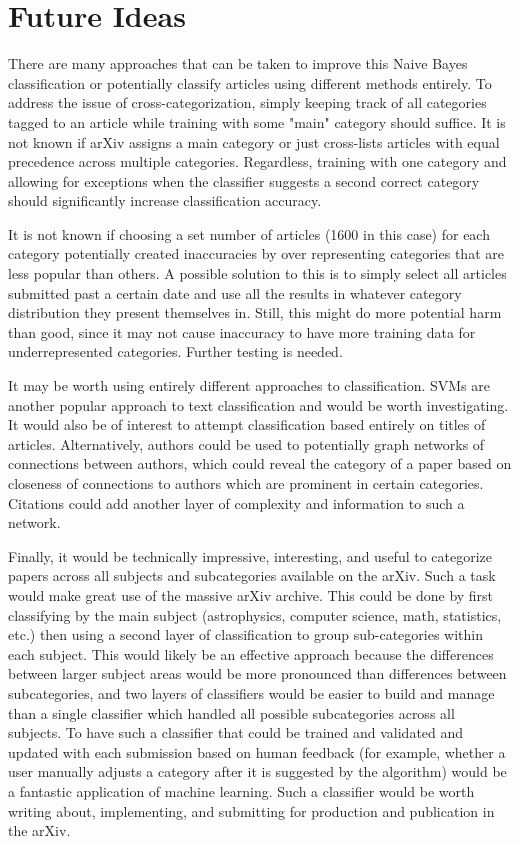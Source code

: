 \documentclass[]{article}
\begin{document}
\section*{Future Ideas}
There are many approaches that can be taken to improve this Naive Bayes classification or potentially classify articles using different methods entirely. 
To address the issue of cross-categorization, simply keeping track of all categories tagged to an article while training with some "main" category should suffice. It is not known if arXiv assigns a main category or just cross-lists articles with equal precedence across multiple categories. Regardless, training with one category and allowing for exceptions when the classifier suggests a second correct category should significantly increase classification accuracy.

It is not known if choosing a set number of articles (1600 in this case) for each category potentially created inaccuracies by over representing categories that are less popular than others. A possible solution to this is to simply select all articles submitted past a certain date and use all the results in whatever category distribution they present themselves in. Still, this might do more potential harm than good, since it may not cause inaccuracy to have more training data for underrepresented categories. Further testing is needed.

It may be worth using entirely different approaches to classification. SVMs are another popular approach to text classification and would be worth investigating. It would also be of interest to attempt classification based entirely on titles of articles. Alternatively, authors could be used to potentially graph networks of connections between authors, which could reveal the category of a paper based on closeness of connections to authors which are prominent in certain categories. Citations could add another layer of complexity and information to such a network.

Finally, it would be technically impressive, interesting, and useful to categorize papers across all subjects and subcategories available on the arXiv. Such a task would make great use of the massive arXiv archive. This could be done by first classifying by the main subject (astrophysics, computer science, math, statistics, etc.) then using a second layer of classification to group sub-categories within each subject. This would likely be an effective approach because the differences between larger subject areas would be more pronounced than differences between subcategories, and two layers of classifiers would be easier to build and manage than a single classifier which handled all possible subcategories across all subjects. To have such a classifier that could be trained and validated and updated with each submission based on human feedback (for example, whether a user manually adjusts a category after it is suggested by the algorithm) would be a fantastic application of machine learning. Such a classifier would be worth writing about, implementing, and submitting for production and publication in the arXiv.
\end{document}
